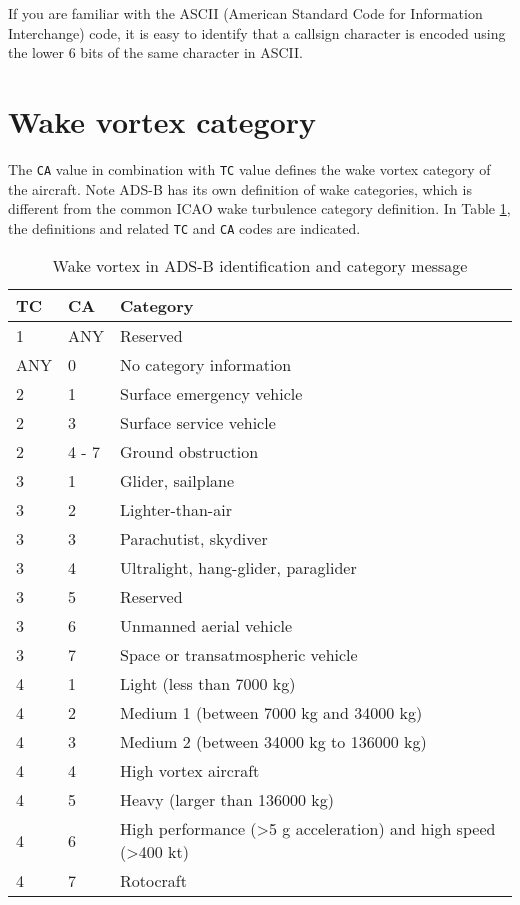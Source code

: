 If you are familiar with the ASCII (American Standard Code for Information Interchange) code, it is easy to identify that a callsign character is encoded using the lower 6 bits of the same character in ASCII.

\section{Wake vortex category}
The \texttt{CA} value in combination with \texttt{TC} value defines the wake vortex category of the aircraft. Note ADS-B has its own definition of wake categories, which is different from the common ICAO wake turbulence category definition. In Table \ref{tb:adsb_id_wake_category}, the definitions and related \texttt{TC} and \texttt{CA} codes are indicated.

\begin{table}[ht]
\caption{Wake vortex in ADS-B identification and category message}
\label{tb:adsb_id_wake_category}
\begin{tabular}{|l|l|l|}
\hline
\textbf{TC} & \textbf{CA} & \textbf{Category} \\ \hline\hline
1 & ANY & Reserved \\ \hline\hline
ANY & 0 & No category information \\ \hline\hline
2 & 1 & Surface emergency vehicle \\ \hline
2 & 3 & Surface service vehicle \\ \hline
2 & 4 - 7 & Ground obstruction \\ \hline\hline
3 & 1 & Glider, sailplane \\ \hline
3 & 2 & Lighter-than-air \\ \hline
3 & 3 & Parachutist, skydiver \\ \hline
3 & 4 & Ultralight, hang-glider, paraglider \\ \hline
3 & 5 & Reserved \\ \hline
3 & 6 & Unmanned aerial vehicle \\ \hline
3 & 7 & Space or transatmospheric vehicle \\ \hline\hline
4 & 1 & Light (less than 7000 kg) \\ \hline
4 & 2 & Medium 1 (between 7000 kg and 34000 kg) \\ \hline
4 & 3 & Medium 2 (between 34000 kg to 136000 kg) \\ \hline
4 & 4 & High vortex aircraft \\ \hline
4 & 5 & Heavy (larger than 136000 kg) \\ \hline
4 & 6 & High performance (\textgreater 5 g acceleration) and high speed (\textgreater 400 kt) \\ \hline
4 & 7 & Rotocraft \\ \hline
\end{tabular}
\end{table}


